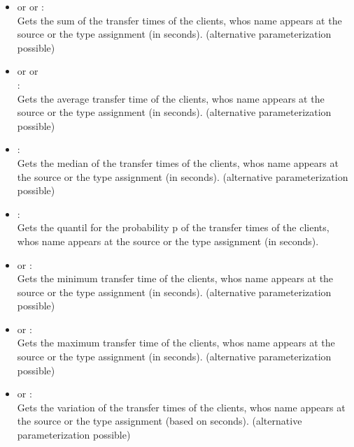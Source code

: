 \begin{itemize}

\item
{} or  or :\\
Gets the sum of the transfer times of the clients, whos name appears at the source or the type assignment  (in seconds).
(alternative parameterization possible)

\item
{} or  or\\
:\\
Gets the average transfer time of the clients, whos name appears at the source or the type assignment  (in seconds).
(alternative parameterization possible)

\item
{}:\\
Gets the median of the transfer times of the clients, whos name appears at the source or the type assignment  (in seconds).
(alternative parameterization possible)

\item
{}:\\
Gets the quantil for the probability p of the transfer times of the clients, whos name appears at the source or the type assignment  (in seconds).

\item
{} or :\\
Gets the minimum transfer time of the clients, whos name appears at the source or the type assignment  (in seconds).
(alternative parameterization possible)

\item
{} or :\\
Gets the maximum transfer time of the clients, whos name appears at the source or the type assignment  (in seconds).
(alternative parameterization possible)

\item
{} or :\\
Gets the variation of the transfer times of the clients, whos name appears at the source or the type assignment  (based on seconds).
(alternative parameterization possible)


\end{itemize}
